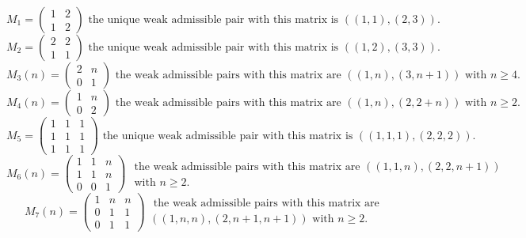 \documentclass[12pt,reqno]{amsart}
\theoremstyle{plain}
\theoremstyle{definition}
\theoremstyle{remark}
\theoremstyle{definition}
\begin{document}
 $$ M_{1}=\left( \begin{array}{cc}
1 & 2\\
1 & 2
\end{array}
    \right)  \text{ the unique weak admissible pair with this matrix is } ((1,1),(2,3)).$$
 $$ M_{2}=\left( \begin{array}{cc}
2 & 2\\
1 & 1
\end{array}
    \right)  \text{ the unique weak admissible pair with this matrix is } ((1,2),(3,3)). $$
    $$ M_{3}(n)=\left( \begin{array}{cc}
2 & n\\
0 & 1
\end{array}
    \right)  \text{ the weak admissible pairs with this matrix are } ((1,n),(3,n+1)) \text{ with } n\geq 4. $$
    $$ M_{4}(n)=\left( \begin{array}{cc}
1 & n\\
0 & 2
\end{array}
    \right)  \text{ the weak admissible pairs with this matrix are } ((1,n),(2,2+n)) \text{ with } n\geq 2. $$
 $$ M_{5}=\left( \begin{array}{ccc}
1 & 1 & 1\\
1 & 1 & 1 \\
1 & 1 & 1
\end{array}
    \right) \text{ the unique weak admissible pair with this matrix is } ((1,1,1),(2,2,2)).$$
$$ M_{6}(n)=\left( \begin{array}{ccc}
1 & 1 & n\\
1 & 1 & n \\
0 & 0 & 1
\end{array}
    \right) \begin{array}{c}
\text{ the weak admissible pairs with this matrix are } ((1,1,n),(2,2,n+1)) \\\text{ with } n\geq 2.\end{array} $$ 
$$ M_{7}(n)=\left( \begin{array}{ccc}
1 & n & n\\
0 & 1 & 1 \\
0 & 1 & 1
\end{array}
    \right) \begin{array}{c}\text{ the weak admissible pairs with this matrix are } \\((1,n,n),(2,n+1,n+1)) \text{ with } n\geq 2.\end{array}$$
\end{document}
